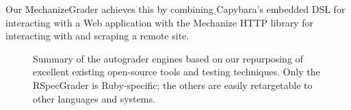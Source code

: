 Our MechanizeGrader achieves this by combining Capybara's embedded DSL
for interacting with a Web application with the Mechanize HTTP library
for interacting with and scraping a remote site.




\begin{figure}
  
  \caption{\label{fig:grader_summary} Summary of the autograder
    engines based on our repurposing of excellent existing open-source
    tools and testing techniques.  Only the RSpecGrader is
    Ruby-specific; the others are easily retargetable to other languages
    and systems.}
\end{figure}


